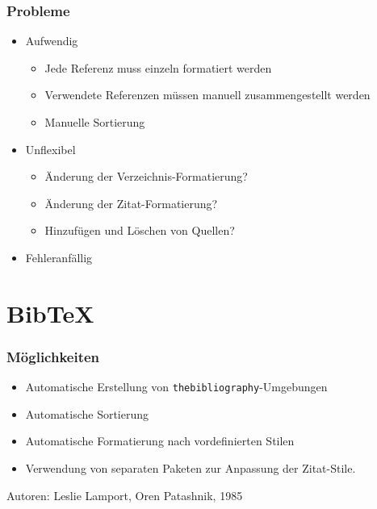 \begin{frame}
  \frametitle{Probleme}
  \onslide<+->

  \begin{itemize}
  \item<+-> Aufwendig
    \begin{itemize}
    \item<+-> Jede Referenz muss einzeln formatiert werden
    \item<+-> Verwendete Referenzen müssen manuell zusammengestellt werden
    \item<+-> Manuelle Sortierung
    \end{itemize}
  \item<+-> Unflexibel
    \begin{itemize}
    \item<+-> Änderung der Verzeichnis-Formatierung?
    \item<+-> Änderung der Zitat-Formatierung?
    \item<+-> Hinzufügen und Löschen von Quellen?
    \end{itemize}
  \item<+-> Fehleranfällig
  \end{itemize}

\end{frame}

\section{Bib\TeX}

\begin{frame}
  \frametitle{Möglichkeiten}
  \onslide<+->

  \begin{itemize}
  \item<+-> Automatische Erstellung von \lstinline|thebibliography|-Umgebungen
  \item<+-> Automatische Sortierung
  \item<+-> Automatische Formatierung nach vordefinierten Stilen
  \item<+-> Verwendung von separaten Paketen zur Anpassung der Zitat-Stile.
  \end{itemize}

  \onslide<+->

  Autoren: Leslie Lamport, Oren Patashnik, 1985

\end{frame}

